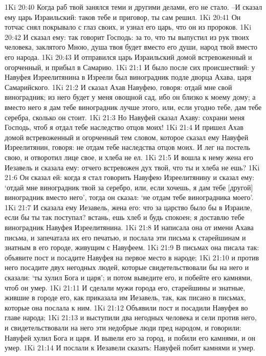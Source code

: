 1Ki 20:40  Когда раб твой занялся теми и другими делами, его не стало. --И сказал ему царь Израильский: таков тебе и приговор, ты сам решил.
1Ki 20:41  Он тотчас снял покрывало с глаз своих, и узнал его царь, что он из пророков.
1Ki 20:42  И сказал ему: так говорит Господь: за то, что ты выпустил из рук твоих человека, заклятого Мною, душа твоя будет вместо его души, народ твой вместо его народа.
1Ki 20:43  И отправился царь Израильский домой встревоженный и огорченный, и прибыл в Самарию.
1Ki 21:1  И было после сих происшествий: у Навуфея Изреелитянина в Изреели был виноградник подле дворца Ахава, царя Самарийского.
1Ki 21:2  И сказал Ахав Навуфею, говоря: отдай мне свой виноградник; из него будет у меня овощной сад, ибо он близко к моему дому; а вместо него я дам тебе виноградник лучше этого, или, если угодно тебе, дам тебе серебра, сколько он стоит.
1Ki 21:3  Но Навуфей сказал Ахаву: сохрани меня Господь, чтоб я отдал тебе наследство отцов моих!
1Ki 21:4  И пришел Ахав домой встревоженный и огорченный тем словом, которое сказал ему Навуфей Изреелитянин, говоря: не отдам тебе наследства отцов моих. И лег на постель свою, и отворотил лице свое, и хлеба не ел.
1Ki 21:5  И вошла к нему жена его Иезавель и сказала ему: отчего встревожен дух твой, что ты и хлеба не ешь?
1Ki 21:6  Он сказал ей: когда я стал говорить Навуфею Изреелитянину и сказал ему: `отдай мне виноградник твой за серебро, или, если хочешь, я дам тебе [другой] виноградник вместо него', тогда он сказал: `не отдам тебе виноградника моего'.
1Ki 21:7  И сказала ему Иезавель, жена его: что за царство было бы в Израиле, если бы ты так поступал? встань, ешь хлеб и будь спокоен; я доставлю тебе виноградник Навуфея Изреелитянина.
1Ki 21:8  И написала она от имени Ахава письма, и запечатала их его печатью, и послала эти письма к старейшинам и знатным в его городе, живущим с Навуфеем.
1Ki 21:9  В письмах она писала так: объявите пост и посадите Навуфея на первое место в народе;
1Ki 21:10  и против него посадите двух негодных людей, которые свидетельствовали бы на него и сказали: `ты хулил Бога и царя'; и потом выведите его, и побейте его камнями, чтоб он умер.
1Ki 21:11  И сделали мужи города его, старейшины и знатные, жившие в городе его, как приказала им Иезавель, так, как писано в письмах, которые она послала к ним.
1Ki 21:12  Объявили пост и посадили Навуфея во главе народа;
1Ki 21:13  и выступили два негодных человека и сели против него, и свидетельствовали на него эти недобрые люди пред народом, и говорили: Навуфей хулил Бога и царя. И вывели его за город, и побили его камнями, и он умер.
1Ki 21:14  И послали к Иезавели сказать: Навуфей побит камнями и умер.
